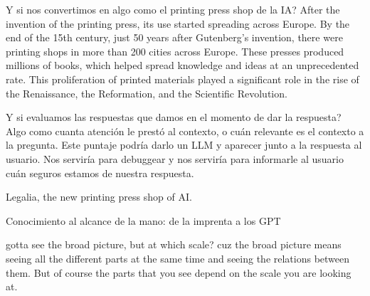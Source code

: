 Y si nos convertimos en algo como el printing press shop de la IA?
After the invention of the printing press, its use started spreading across Europe. By the end of the 15th century, 
just 50 years after Gutenberg's invention, there were printing shops in more than 200 cities across Europe. 
These presses produced millions of books, which helped spread knowledge and ideas at an unprecedented rate. 
This proliferation of printed materials played a significant role in the rise of the Renaissance, the Reformation, and the Scientific Revolution.


Y si evaluamos las respuestas que damos en el momento de dar la respuesta? Algo como cuanta atención le prestó al contexto, o cuán 
relevante es el contexto a la pregunta. Este puntaje podría darlo un LLM y aparecer junto a la respuesta al usuario. 
Nos serviría para debuggear y nos serviría para informarle al usuario cuán seguros estamos de nuestra respuesta. 


Legalia, the new printing press shop of AI. 





Conocimiento al alcance de la mano: de la imprenta a los GPT





gotta see the broad picture, but at which scale? cuz the broad picture means seeing all the different parts at the same time
and seeing the relations between them. But of course the parts that you see depend on the scale you are looking at. 